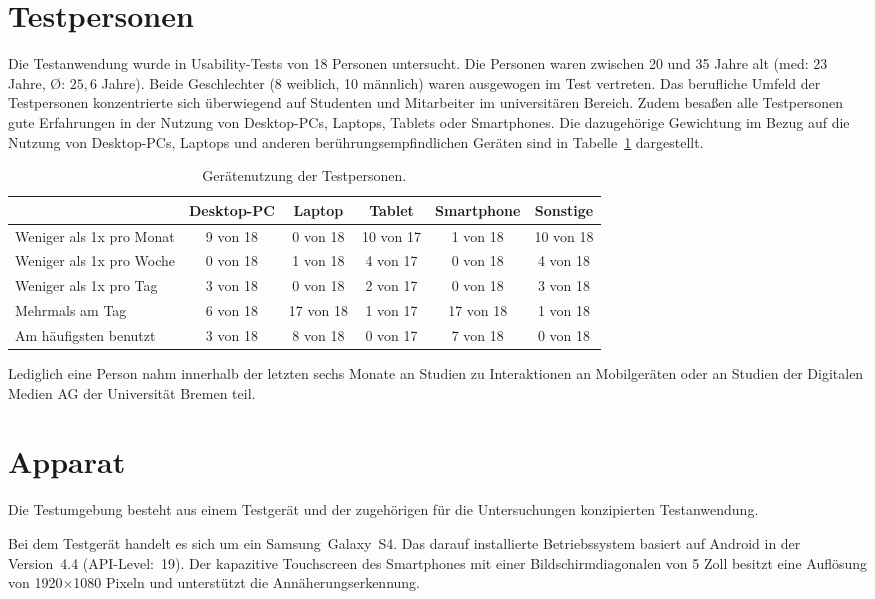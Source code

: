 \documentclass[12pt,numbers=noenddot,parskip,bibliography=totocnumbered,listof=totocnumbered]{scrreprt}
\begin{document}
\section{Testpersonen}
Die Testanwendung wurde in Usability-Tests von 18 Personen untersucht. Die Personen waren zwischen 20 und 35 Jahre alt (med: $23$ Jahre, \O: $25{,}6$ Jahre). Beide Geschlechter (8 weiblich, 10 männlich) waren ausgewogen im Test vertreten. Das berufliche Umfeld der Testpersonen konzentrierte sich überwiegend auf Studenten und Mitarbeiter im universitären Bereich. Zudem besaßen alle Testpersonen gute Erfahrungen in der Nutzung von Desktop-PCs, Laptops, Tablets oder Smartphones. Die dazugehörige Gewichtung im Bezug auf die Nutzung von Desktop-PCs, Laptops und anderen berührungsempfindlichen Geräten sind in Tabelle~\ref{nutzungtestpersonen} dargestellt.
\begin{table}
\centering
\renewcommand{\arraystretch}{2}
\setlength{\tabcolsep}{2.2pt}
\begin{tabular}{ p{4.8cm} | c c c c c}
& Desktop-PC & Laptop & Tablet & Smartphone & Sonstige\\\hline
Weniger als 1x pro Monat & 9 von 18 & 0 von 18 & 10 von 17 & 1 von 18 & 10 von 18 \\
Weniger als 1x pro Woche & 0 von 18 & 1 von 18 & 4 von 17 & 0 von 18 & 4 von 18 \\
Weniger als 1x pro Tag & 3 von 18 & 0 von 18 & 2 von 17 & 0 von 18 & 3 von 18 \\
Mehrmals am Tag & 6 von 18 & 17 von 18 & 1 von 17 & 17 von 18 & 1 von 18 \\
\hline
Am häufigsten benutzt & 3 von 18 & 8 von 18 & 0 von 17 & 7 von 18 & 0 von 18 \\
\end{tabular}
\caption{Gerätenutzung der Testpersonen.}
\label{nutzungtestpersonen}
\end{table}
Lediglich eine Person nahm innerhalb der letzten sechs Monate an Studien zu Interaktionen an Mobilgeräten oder an Studien der Digitalen Medien AG der Universität Bremen teil.

\section{Apparat}
Die Testumgebung besteht aus einem Testgerät und der zugehörigen für die Untersuchungen konzipierten Testanwendung.

Bei dem Testgerät handelt es sich um ein \mbox{Samsung Galaxy S4}. Das darauf installierte Betriebssystem basiert auf Android in der \mbox{Version 4.4} \mbox{(API-Level: 19)}. Der kapazitive Touchscreen des Smartphones mit einer Bildschirmdiagonalen von 5 Zoll besitzt eine Auflösung von \mbox{1920$\times$1080} Pixeln und unterstützt die Annäherungserkennung.
\end{document}
